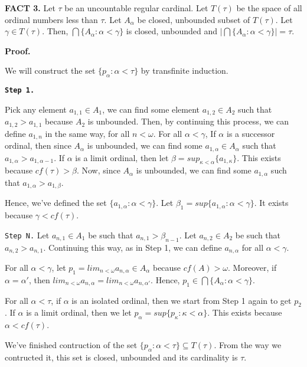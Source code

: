 \documentclass{article}
\begin{document}
\textbf{FACT 3.} Let $\tau$ be an uncountable regular cardinal. Let $T(\tau)$ be the space 
of all ordinal numbers less than $\tau$. Let $A_\alpha$ be closed, unbounded subset of $T(\tau)$. Let $\gamma\in T(\tau).$ Then, $\bigcap \{A_\alpha : \alpha<\gamma\}$ is closed, unbounded and $\left| \bigcap \{A_\alpha: \alpha<\gamma\} \right|=\tau$.



\vskip 15pt
\textbf{Proof.} 

We will construct the set $\{p_\alpha: \alpha<\tau\}$ by transfinite induction.

\vskip 10pt
\texttt{\textbf{Step 1.}}

Pick any element $a_{1,1}\in A_1$, we can find some element $a_{1,2}\in A_2$ such that $a_{1,2}>a_{1,1}$ because $A_2$ is unbounded. Then, 
by continuing this process, we can define $a_{1,n}$ in the same way, for all $n<\omega$. 
For all $\alpha<\gamma$,
If $\alpha$ is a successor ordinal, then since $A_\alpha$ is unbounded, we can find some $a_{1,\alpha} \in A_\alpha$ such that $a_{1,\alpha}>a_{1,\alpha-1}$. If $\alpha$ is a limit ordinal, then let $\beta=sup_{\kappa<\alpha} \{a_{1,\kappa}\}$. This exists because $cf(\tau)>\beta$. Now, since $A_\alpha$ is unbounded, we can find some $a_{1,\alpha}$ such that $a_{1,\alpha} >  a_{1,\beta}$.

Hence, we've defined the set $\{a_{1,\alpha}: \alpha <\gamma\}$. Let $\beta_1=sup\{a_{1,\alpha}: \alpha <\gamma\}$. It exists because $\gamma<cf(\tau)$. 

\vskip 10pt

\texttt{Step N.}
Let $a_{n,1}\in A_1$ be such that $a_{n,1} > \beta_{n-1}$. Let $a_{n,2}\in A_2$ be such that $a_{n,2} > a_{n,1}$. Continuing this way, as in Step 1, we can 
define $a_{n,\alpha}$ for all $\alpha<\gamma$. 
\vskip 10pt


For all $\alpha<\gamma$, let $p_1= lim_{n<\omega} a_{n,\alpha} \in A_\alpha$ because $cf(A)>\omega$. Moreover, if $\alpha =\alpha'$, then $lim_{n<\omega} a_{n,\alpha}= lim_{n<\omega} a_{n,\alpha'}$. Hence, $p_1\in \bigcap \{A_\alpha: \alpha<\gamma\}$. 
\vskip 10pt


For all $\alpha <\tau$, if $\alpha$ is an isolated ordinal, then we start from Step 1 again to get $p_2$. 
If $\alpha$ is a limit ordinal, then we let $p_\alpha= sup \{p_\kappa: \kappa<\alpha\}$. This exists because $\alpha<cf(\tau)$. 

\vskip 10pt

We've finished contruction of the set $\{p_\alpha: \alpha<\tau\}\subseteq T(\tau)$.  From the way we contructed it, this set is closed, unbounded and its cardinality is $\tau$.
\end{document}

